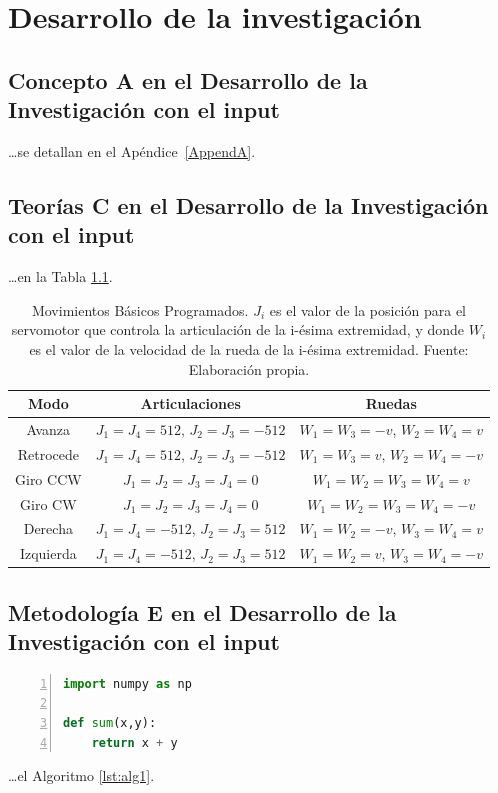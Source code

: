 \chapter{Desarrollo de la investigación}



\section{Concepto A en el Desarrollo de la Investigación con el input}

\lipsum[1-1]

\dots se detallan en el Apéndice~\ref{AppendA}.

\section{Teorías C  en el Desarrollo de la Investigación con el input}

\lipsum[1-1]

\dots en la Tabla \ref{table:movimientos_basicos}.

\begin{table}[H]
\centering
\begin{tabular}{| c | c | c|} 
 \hline
 \textbf{Modo} & \textbf{Articulaciones} & \textbf{Ruedas}\\ [0.3ex] 
 \hline \hline
 Avanza & $J_1=J_4=512$, $J_2=J_3=-512$ & $W_1=W_3=-v$, $W_2=W_4=v$  \\ 
 \hline
 Retrocede & $J_1=J_4=512$, $J_2=J_3=-512$ & $W_1=W_3=v$, $W_2=W_4=-v$  \\
 \hline \hline 
 Giro CCW & $J_1=J_2=J_3=J_4=0$ & $W_1=W_2=W_3=W_4=v$ \\
 \hline 
 Giro CW & $J_1=J_2=J_3=J_4=0$ & $W_1=W_2=W_3=W_4=-v$  \\ %
 \hline \hline 
 Derecha & $J_1=J_4=-512$, $J_2=J_3=512$ & $W_1=W_2=-v$, $W_3=W_4=v$  \\ %
 \hline
 Izquierda & $J_1=J_4=-512$, $J_2=J_3=512$ & $W_1=W_2=v$, $W_3=W_4=-v$  \\
 \hline
\end{tabular}
\caption[Movimientos Básicos Programados]
	{Movimientos Básicos Programados. $J_i$ es el valor de la posición para el servomotor que controla la articulación de la i-ésima extremidad, y donde $W_i$ es el valor de la velocidad de la rueda de la i-ésima extremidad.  Fuente: Elaboración propia.}
\label{table:movimientos_basicos}
\end{table}

\section{Metodología E  en el Desarrollo de la Investigación con el input}
\lipsum[1-1]

\begin{lstlisting}[language=Python, caption=Ejemplo en Python, label={lst:alg1}, numbers=left]
import numpy as np
    
def sum(x,y):
    return x + y
\end{lstlisting}

\lipsum[1-1]

\dots el Algoritmo \ref{lst:alg1}.

